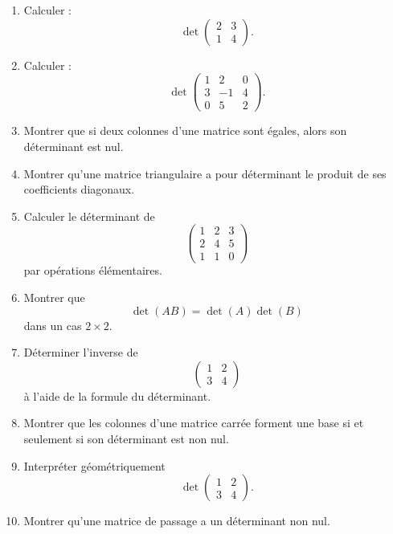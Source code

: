 \documentclass[11pt,a4paper]{article}
\theoremstyle{remark}
\begin{document}
\begin{enumerate}[label=\textbf{Exercice \arabic*.}]
    \item Calculer :
    \[
    \det\begin{pmatrix}
    2 & 3\\
    1 & 4
    \end{pmatrix}.
    \]

    \item Calculer :
    \[
    \det\begin{pmatrix}
    1 & 2 & 0\\
    3 & -1 & 4\\
    0 & 5 & 2
    \end{pmatrix}.
    \]

    \item Montrer que si deux colonnes d’une matrice sont égales, alors son déterminant est nul.

    \item Montrer qu’une matrice triangulaire a pour déterminant le produit de ses coefficients diagonaux.

    \item Calculer le déterminant de
    \[
    \begin{pmatrix}
    1 & 2 & 3\\
    2 & 4 & 5\\
    1 & 1 & 0
    \end{pmatrix}
    \]
    par opérations élémentaires.

    \item Montrer que
    \[
    \det(AB)=\det(A)\det(B)
    \]
    dans un cas \(2\times 2\).

    \item Déterminer l’inverse de
    \[
    \begin{pmatrix}
    1 & 2\\
    3 & 4
    \end{pmatrix}
    \]
    à l’aide de la formule du déterminant.

    \item Montrer que les colonnes d’une matrice carrée forment une base si et seulement si son déterminant est non nul.

    \item Interpréter géométriquement
    \[
    \det\begin{pmatrix}
    1 & 2\\
    3 & 4
    \end{pmatrix}.
    \]

    \item Montrer qu’une matrice de passage a un déterminant non nul.
\end{enumerate}
\end{document}
